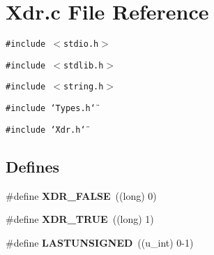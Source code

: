 \section{Xdr.c File Reference}
\label{Xdr_8c}
{\tt \#include $<$stdio.h$>$}\par
{\tt \#include $<$stdlib.h$>$}\par
{\tt \#include $<$string.h$>$}\par
{\tt \#include \char`\"{}Types.h\char`\"{}}\par
{\tt \#include \char`\"{}Xdr.h\char`\"{}}\par
\subsection*{Defines}
\begin{CompactItemize}
\item 
\#define {\bf XDR\_\-FALSE}\ ((long) 0)
\item 
\#define {\bf XDR\_\-TRUE}\ ((long) 1)
\item 
\#define {\bf LASTUNSIGNED}\ ((u\_\-int) 0-1)
\end{CompactItemize}
